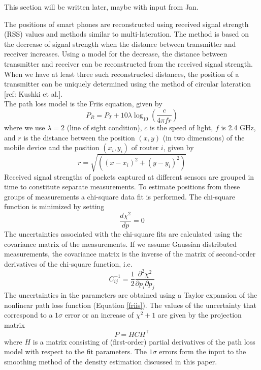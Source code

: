 \documentclass[10pt,a4paper]{article}
\begin{document}
This section will be written later, maybe with input from Jan. 

The positions of smart phones are reconstructed using received signal strength (RSS) values and methods similar to multi-lateration. 
The method is based on the decrease of signal strength when the distance between transmitter and receiver increases.
Using a model for the decrease, the distance between transmitter and receiver can be reconstructed from the received signal strength.
When we have at least three such reconstructed distances, the position of a transmitter can be uniquely determined using the method of circular lateration [ref: Kushki et al.].\\
The path loss model is the Friis equation, given by
\begin{equation}
P_{R}=P_{T}+10\lambda\log_{10}(\frac{c}{4\pi fr})
\label{friis}
\end{equation}
where we use $\lambda=2$ (line of sight condition), $c$ is the speed of light, $f$ is 2.4 GHz, and $r$ is the distance between the position $(x,y)$ (in two dimensions) of the mobile device and the position $(x_{i},y_{i})$ of router $i$, given by 
\begin{equation}
r=\sqrt{((x-x_{i})^2+(y-y_{i})^2)}
\end{equation}
Received signal strengths of packets captured at different sensors are grouped in time to constitute separate measurements. 
To estimate positions from these groups of measurements a chi-square data fit is performed.
The chi-square function is minimized by setting
\begin{equation}
\frac{d\chi^2}{dp}=0
\end{equation}
The uncertainties associated with the chi-square fits are calculated using the covariance matrix of the measurements.
If we assume Gaussian distributed measurements, the covariance matrix is the inverse of the matrix of second-order derivatives of the chi-square function, i.e.
\begin{equation}
C_{ij}^{-1}=\frac{1}{2}\frac{\partial^2\chi^2}{\partial p_{i}\partial p_{j}}
\end{equation}
The uncertainties in the parameters are obtained using a Taylor expansion of the nonlinear path loss function (Equation \ref{friis}).
The values of the uncertainty that correspond to a $1\sigma$ error or an increase of $\chi^2+1$ are given by the projection matrix
\begin{equation}
P=HCH^\top
\end{equation}
where $H$ is a matrix consisting of (first-order) partial derivatives of the path loss model with respect to the fit parameters.
The $1\sigma$ errors form the input to the smoothing method of the density estimation discussed in this paper.
\end{document}
